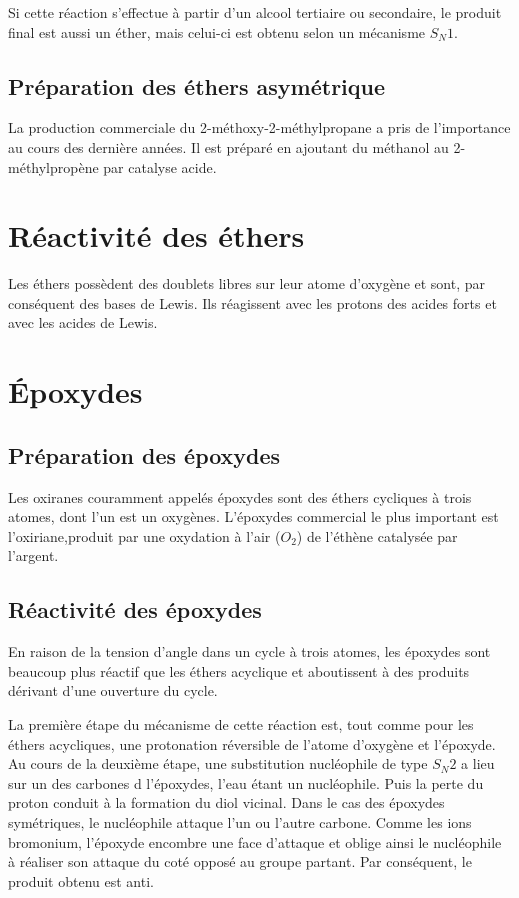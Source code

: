 Si  cette réaction s'effectue à partir d'un alcool tertiaire ou secondaire, le produit final est aussi un éther, mais celui-ci est obtenu selon un mécanisme $S_N1$.

\subsection{Préparation des éthers asymétrique}

La production commerciale du 2-méthoxy-2-méthylpropane a pris de l'importance au cours des dernière années.
Il est préparé en ajoutant du méthanol au 2-méthylpropène par catalyse acide.



\section{Réactivité des éthers}

Les éthers possèdent des doublets libres sur leur atome d'oxygène et sont, par conséquent des bases de Lewis.
Ils réagissent avec les protons des acides forts et avec les acides de Lewis.

\section{\'Epoxydes}

\subsection{Préparation des époxydes}
Les oxiranes couramment appelés époxydes sont des éthers  cycliques à trois atomes, dont l'un est un oxygènes.
L'époxydes commercial le plus important est l'oxiriane,produit par une oxydation à l'air ($O_2$) de l'éthène catalysée par l'argent.

\subsection{Réactivité des époxydes}
En raison de la tension d'angle dans un cycle à trois atomes, les époxydes sont beaucoup plus réactif que les éthers acyclique et aboutissent à des produits dérivant d'une ouverture du cycle.


La première étape du mécanisme de cette réaction est, tout comme pour les éthers acycliques, une protonation réversible de l'atome d'oxygène et l'époxyde.
Au cours de la deuxième étape, une substitution nucléophile de type $S_N2$ a lieu sur un des carbones d l'époxydes, l'eau étant un nucléophile.
Puis la perte du proton conduit à la formation du diol vicinal.
Dans le cas des époxydes symétriques, le nucléophile attaque l'un ou l'autre carbone.
Comme les ions bromonium, l'époxyde encombre une face d'attaque et oblige ainsi le nucléophile à réaliser son attaque du coté opposé au groupe partant.
Par conséquent, le produit obtenu est anti.



